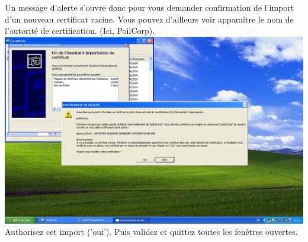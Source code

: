 Un message d'alerte s'ouvre donc pour vous demander confirmation de l'import d'un nouveau certificat racine. Vous pouvez d'ailleurs voir apparaître le nom de l'autorité de certification. (Ici, PoilCorp).\\
\includegraphics[width=\screenShotSize{}]{img/importCacertAuthorize.PNG}\\
Authorisez cet import ('oui').
Puis validez et quittez toutes les fenêtres ouvertes.

